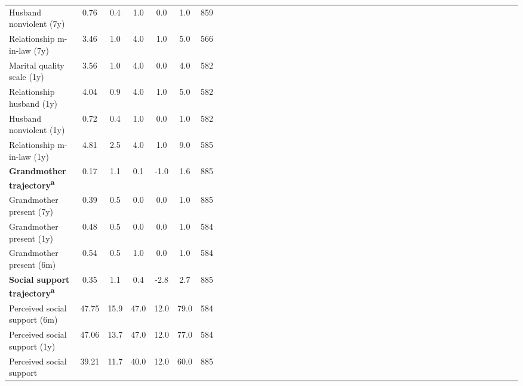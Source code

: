 {\begin{tabular}{l*{6}{ccccccc}}
\hspace{0.25cm} Husband nonviolent (7y)&     0.76&      0.4&      1.0&      0.0&      1.0&      859\\
\hspace{0.25cm} Relationship m-in-law (7y)&     3.46&      1.0&      4.0&      1.0&      5.0&      566\\
\hspace{0.25cm} Marital quality scale (1y)&     3.56&      1.0&      4.0&      0.0&      4.0&      582\\
\hspace{0.25cm} Relationship husband (1y)&     4.04&      0.9&      4.0&      1.0&      5.0&      582\\
\hspace{0.25cm} Husband nonviolent (1y)&     0.72&      0.4&      1.0&      0.0&      1.0&      582\\
\hspace{0.25cm} Relationship m-in-law (1y)&     4.81&      2.5&      4.0&      1.0&      9.0&      585\\
\textbf{Grandmother trajectory\textsuperscript{a}}&     0.17&      1.1&      0.1&     -1.0&      1.6&      885\\
\hspace{0.25cm} Grandmother present (7y)&     0.39&      0.5&      0.0&      0.0&      1.0&      885\\
\hspace{0.25cm} Grandmother present (1y)&     0.48&      0.5&      0.0&      0.0&      1.0&      584\\
\hspace{0.25cm} Grandmother present (6m)&     0.54&      0.5&      1.0&      0.0&      1.0&      584\\
\textbf{Social support trajectory\textsuperscript{a}}&     0.35&      1.1&      0.4&     -2.8&      2.7&      885\\
\hspace{0.25cm} Perceived social support (6m)&    47.75&     15.9&     47.0&     12.0&     79.0&      584\\
\hspace{0.25cm} Perceived social support (1y)&    47.06&     13.7&     47.0&     12.0&     77.0&      584\\
\hspace{0.25cm} Perceived social support&    39.21&     11.7&     40.0&     12.0&     60.0&      885\\
\bottomrule
\end{tabular}
}
